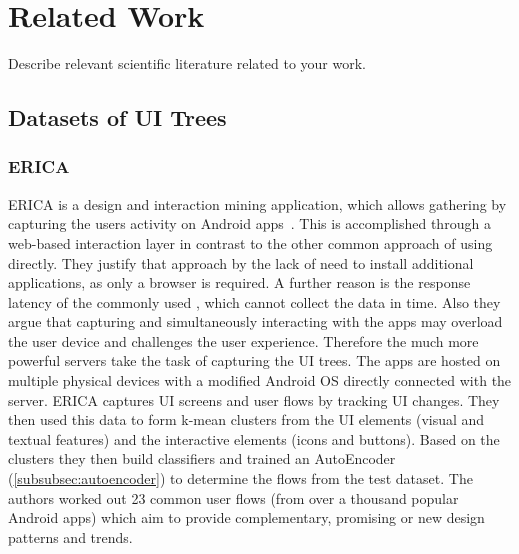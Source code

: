 \chapter{Related Work}

Describe relevant scientific literature related to your work.


\section{Datasets of UI Trees}

\subsection{ERICA}

ERICA is a design and interaction mining application, which allows gathering  by capturing the users activity on Android apps~\cite{deka2016erica}.
This is accomplished through a web-based interaction layer in contrast to the other common approach of using  directly.
They justify that approach by the lack of need to install additional applications, as only a browser is required.
A further reason is the response latency of the commonly used , which cannot collect the data in time.
Also they argue that capturing and simultaneously interacting with the apps may overload the user device and challenges the user experience.
Therefore the much more powerful servers take the task of capturing the UI trees.
The apps are hosted on multiple physical devices with a modified Android OS directly connected with the server.
ERICA captures UI screens and user flows by tracking UI changes.
They then used this data to form k-mean clusters from the UI elements (visual and textual features) and the interactive elements (icons and buttons).
Based on the clusters they then build classifiers and trained an AutoEncoder (\ref{subsubsec:autoencoder}) to determine the flows from the test dataset.
The authors worked out 23 common user flows (from over a thousand popular Android apps) which aim to provide complementary, promising or new design patterns and trends.



